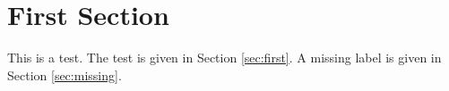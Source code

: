 \documentclass[final]{article}
\begin{document}
\section{First Section\label{sec:first}}
This is a test. 
The test is given in Section \ref{sec:first}.
A missing label is given in Section \ref{sec:missing}.
\end{document}
